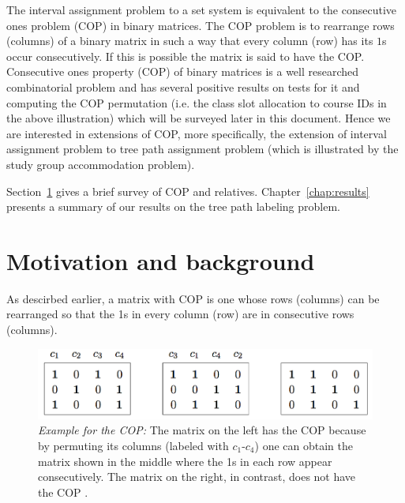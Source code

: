 \documentclass[MS,]{iitmdiss}
\begin{document}

The interval assignment problem to a set system is equivalent to the
consecutive ones problem (COP) in binary matrices\cite{wlh02,
  nsnrs09}.  The COP problem is to rearrange rows (columns) of a
binary matrix in such a way that every column (row) has its $1$s occur
consecutively. If this is possible the matrix is said to have the COP.
Consecutive ones property (COP) of binary matrices is a well
researched combinatorial problem and has several positive results on
tests for it and computing the COP permutation (i.e. the class slot
allocation to course IDs in the above illustration) which will be
surveyed later in this document. Hence we are interested in extensions
of COP, more specifically, the extension of interval assignment
problem to tree path assignment problem (which is illustrated by the
study group accommodation problem). 


 

Section~\ref{sec:motivation} gives a brief survey of COP and relatives.
Chapter~\ref{chap:results} presents a summary of our results on the
tree path labeling problem.

\section{Motivation and background}
\label{sec:motivation}

As descirbed earlier, a matrix with COP is one whose rows (columns)
can be rearranged so that the 1s in every column (row) are in
consecutive rows (columns).

\begin{figure}[h]
  \centering
  \includegraphics[scale=0.4]{../img/0_cop_nocop.png}
  
  \caption{{\em Example for the COP:} The matrix on the left has the
    COP because by permuting its columns (labeled with $c_1$-$c_4$)
    one can obtain the matrix shown in the middle where the 1s in each
    row appear consecutively. The matrix on the right, in contrast,
    does not have the COP \cite{at72,d08phd}.}
  \label{fig:cop-matrix}
\end{figure}
\end{document}
